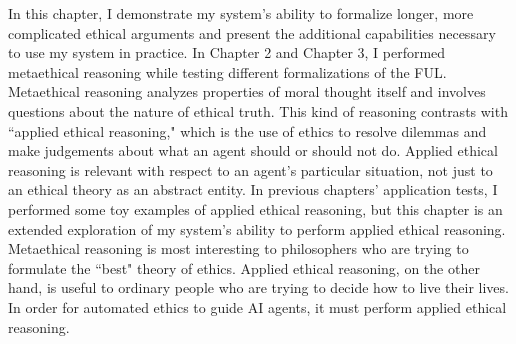 %
\begin{isabellebody}%
%
%
\isadelimtheory
%
\endisadelimtheory
%
\isatagtheory
%
\endisatagtheory
{\isafoldtheory}%
%
\isadelimtheory
%
\endisadelimtheory
%
\isadelimdocument
%
\endisadelimdocument
%
\isatagdocument
%
\isamarkuptrue%
%
\endisatagdocument
{\isafolddocument}%
%
\isadelimdocument
%
\endisadelimdocument
%
\begin{isamarkuptext}%
In this chapter, I 
demonstrate my system's ability to formalize longer, more complicated ethical arguments and present 
the additional capabilities necessary to use my system in practice. In Chapter 2
and Chapter 3, I performed metaethical reasoning while testing different formalizations of the FUL. Metaethical
reasoning analyzes properties of moral thought itself and involves questions about the nature of ethical
truth. This kind of reasoning contrasts with ``applied 
ethical reasoning," which is the use of ethics to resolve dilemmas and make judgements about 
what an agent should or should not do. Applied ethical reasoning is relevant with respect to an agent's
particular situation, not just to an ethical theory as an abstract entity. In previous chapters' application tests,
I performed some toy examples of applied ethical reasoning, but this chapter is an extended exploration of
my system's ability to perform applied ethical reasoning. Metaethical reasoning is most interesting to philosophers 
who are trying to formulate the ``best" theory of ethics. Applied ethical reasoning, on the other hand, 
is useful to ordinary people who are trying to decide how to live their lives. In order for automated 
ethics to guide AI agents, it must perform applied ethical reasoning. 


\end{isamarkuptext}
\end{isabellebody}
